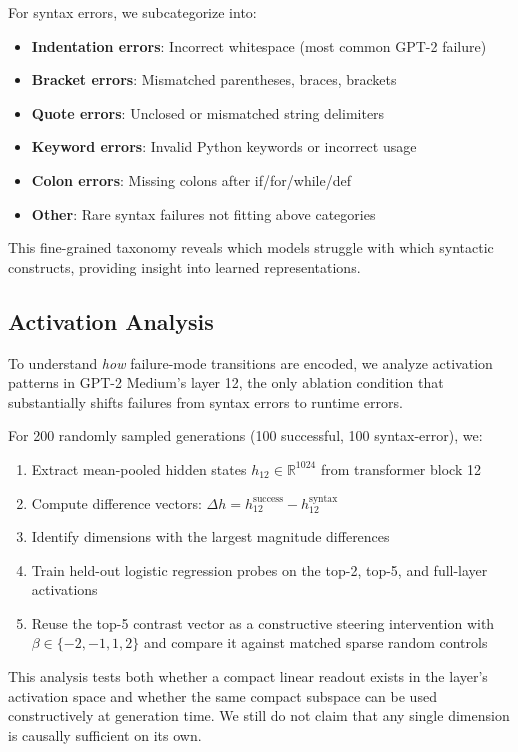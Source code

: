 \documentclass[preprint,12pt,authoryear]{elsarticle}
\begin{document}
For syntax errors, we subcategorize into:

\begin{itemize}
\item \textbf{Indentation errors}: Incorrect whitespace (most common GPT-2 failure)
\item \textbf{Bracket errors}: Mismatched parentheses, braces, brackets
\item \textbf{Quote errors}: Unclosed or mismatched string delimiters
\item \textbf{Keyword errors}: Invalid Python keywords or incorrect usage
\item \textbf{Colon errors}: Missing colons after if/for/while/def
\item \textbf{Other}: Rare syntax failures not fitting above categories
\end{itemize}

This fine-grained taxonomy reveals which models struggle with which syntactic constructs, providing insight into learned representations.

\subsection{Activation Analysis}

To understand \emph{how} failure-mode transitions are encoded, we analyze activation patterns in GPT-2 Medium's layer 12, the only ablation condition that substantially shifts failures from syntax errors to runtime errors.

For 200 randomly sampled generations (100 successful, 100 syntax-error), we:

\begin{enumerate}
\item Extract mean-pooled hidden states $h_{12} \in \mathbb{R}^{1024}$ from transformer block 12
\item Compute difference vectors: $\Delta h = h_{12}^{\text{success}} - h_{12}^{\text{syntax}}$
\item Identify dimensions with the largest magnitude differences
\item Train held-out logistic regression probes on the top-2, top-5, and full-layer activations
\item Reuse the top-5 contrast vector as a constructive steering intervention with $\beta \in \{-2,-1,1,2\}$ and compare it against matched sparse random controls
\end{enumerate}

This analysis tests both whether a compact linear readout exists in the layer's activation space and whether the same compact subspace can be used constructively at generation time. We still do not claim that any single dimension is causally sufficient on its own.
\end{document}
